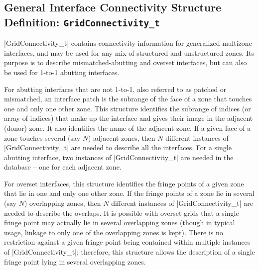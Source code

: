\subsection{General Interface Connectivity Structure Definition: \texttt{GridConnectivity\_t}}
\label{s:GridConnectivity}

|GridConnectivity_t| contains connectivity information for generalized
multizone interfaces, and may be used for any mix of structured and
unstructured zones.
Its purpose is to describe mismatched-abutting and overset interfaces,
but can also be used for 1-to-1 abutting interfaces.

For abutting interfaces that are not 1-to-1, also referred to as patched
or mismatched, an interface patch is the subrange of the face of a zone
that touches one and only one other zone.
This structure identifies the subrange of indices (or array of indices)
that make up the interface and gives their image in the adjacent (donor)
zone.
It also identifies the name of the adjacent zone.
If a given face of a zone touches several (say $N$) adjacent zones,
then $N$ different instances of |GridConnectivity_t| are needed to
describe all the interfaces.
For a single abutting interface, two instances of |GridConnectivity_t|
are needed in the database -- one for each adjacent zone.

For overset interfaces, this structure identifies the fringe points of
a given zone that lie in one and only one other zone.  If the fringe
points of a zone lie in several (say $N$) overlapping zones, then $N$
different instances of |GridConnectivity_t| are needed to describe the
overlaps.  It is possible with overset grids that a single fringe point
may actually lie in several overlapping zones (though in typical usage,
linkage to only one of the overlapping zones is kept).  There is no
restriction against a given fringe point being contained within multiple
instances of |GridConnectivity_t|; therefore, this structure allows the
description of a single fringe point lying in several overlapping zones.

